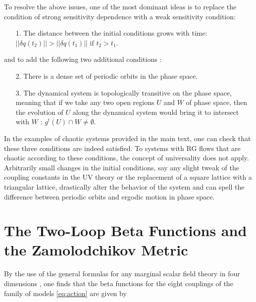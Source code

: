 \begin{subappendices}
To resolve the above issues, one of the most dominant ideas is to replace the condition of strong sensitivity dependence with a weak sensitivity condition:
\begin{enumerate}
    \item[1.] The distance between the initial conditions grows with time: $\left|\left|\delta q(t_2)\right|\right| > \left|\left|\delta q(t_1)\right|\right|$ if $t_2>t_1$.
\end{enumerate}
and to add the following two additional conditions \cite{devaney1989introduction}:
 \begin{enumerate}
     \item[2.] There is a dense set of periodic orbits in the phase space.
     \item[3.] The dynamical system is topologically transitive on the phase space, meaning that if we take any two open regions $U$ and $W$ of phase space, then the evolution of $U$ along the dynamical system would bring it to intersect with $W$ : $g^t(U) \cap W \neq \emptyset$.
 \end{enumerate}
 In the examples of chaotic systems provided in the main text, one can check that these three conditions are indeed satisfied. 
To systems with RG flows that are chaotic according to these conditions, the concept of universality does not apply. Arbitrarily small changes in the initial conditions, say any slight tweak of the coupling constants in the UV theory or the replacement of a square lattice with a triangular lattice, drastically alter the behavior of the system and can spell the difference between periodic orbits and ergodic motion in phase space. 





\section{The Two-Loop Beta Functions and the Zamolodchikov Metric}
By the use of the general formulas for any marginal scalar field theory in four dimensions \cite{Jack:1990eb}, one finds that the beta functions for the eight couplings of the family of models \cref{eq:action} are given by
\label{appendix:beta}
\label{appendix:metric}


\end{subappendices}
